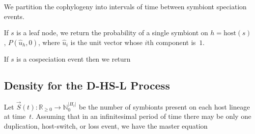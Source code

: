 \documentclass{article}
\begin{document}
            We partition the cophylogeny into intervals of time between
            symbiont speciation events.

            If $s$ is a leaf node, we return the probability of a single
            symbiont on $h = \text{host}\left(s\right)$, $P\left(\hat{u}_h,
            0\right)$, where $\hat{u}_i$ is the unit vector whose $i$th
            component is~$1$.

            If $s$ is a cospeciation event then we return

        \subsection*{Density for the D-HS-L Process}

            Let $\vec{S}\left(t\right) : \mathbb{R}_{\geq 0} \to
            \mathbb{N}_{0}^{\lvert{H_t}\rvert}$ be the number of symbionts
            present on each host lineage at time~$t$. Assuming that in an
            infinitesimal period of time there may be only one duplication,
            host-switch, or loss event, we have the master equation
\end{document}
